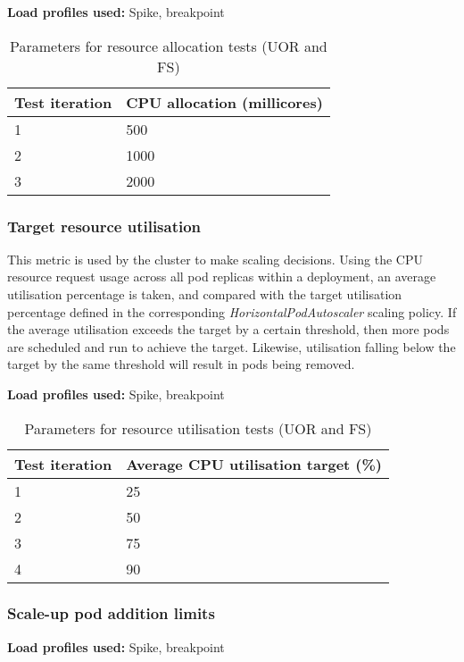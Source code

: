 \textbf{Load profiles used:} Spike, breakpoint

\begin{table}[h]
    \centering
    \begin{tabularx}{\textwidth}{|X|X|}
        \hline
        \textbf{Test iteration} & \textbf{CPU allocation (millicores)}  \\ \hline
        1 & 500 \\ \hline
        2 & 1000 \\ \hline
        3 & 2000 \\ \hline
    \end{tabularx}
    \caption{Parameters for resource allocation tests (UOR and FS)}
    \label{table:test-resource-allocation}
\end{table}

\subsubsection{Target resource utilisation}

This metric is used by the cluster to make scaling decisions. Using the CPU resource request usage across all pod replicas within a deployment, an average utilisation percentage is taken, and compared with the target utilisation percentage defined in the corresponding \textit{HorizontalPodAutoscaler} scaling policy. If the average utilisation exceeds the target by a certain threshold, then more pods are scheduled and run to achieve the target. Likewise, utilisation falling below the target by the same threshold will result in pods being removed.

\noindent\textbf{Load profiles used:} Spike, breakpoint

\begin{table}[h]
    \centering
    \begin{tabularx}{\textwidth}{|X|X|}
        \hline
        \textbf{Test iteration} & \textbf{Average CPU utilisation target (\%)}  \\ \hline
        1 & 25 \\ \hline
        2 & 50 \\ \hline
        3 & 75 \\ \hline
        4 & 90 \\ \hline
    \end{tabularx}
    \caption{Parameters for resource utilisation tests (UOR and FS)}
    \label{table:test-resource-utilisation}
\end{table}

\subsubsection{Scale-up pod addition limits}

\noindent\textbf{Load profiles used:} Spike, breakpoint